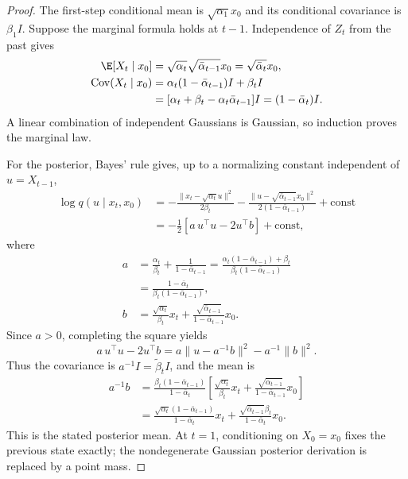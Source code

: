 \begin{proof}
The first-step conditional mean is $\sqrt{\alpha_1}x_0$ and its conditional covariance is $\beta_1I$. Suppose the marginal formula holds at $t-1$. Independence of $Z_t$ from the past gives
\begin{align}
 \E[X_t\mid x_0]
 &=\sqrt{\alpha_t}\sqrt{\bar\alpha_{t-1}}x_0
 =\sqrt{\bar\alpha_t}x_0,\\
 \operatorname{Cov}(X_t\mid x_0)
 &=\alpha_t(1-\bar\alpha_{t-1})I+\beta_tI\\
 &=[\alpha_t+\beta_t-\alpha_t\bar\alpha_{t-1}]I
 =(1-\bar\alpha_t)I.
\end{align}
A linear combination of independent Gaussians is Gaussian, so induction proves the marginal law.

For the posterior, Bayes' rule gives, up to a normalizing constant independent of $u=X_{t-1}$,
\begin{align}
 \log q(u\mid x_t,x_0)
 &= -\frac{\|x_t-\sqrt{\alpha_t}u\|^2}{2\beta_t}
    -\frac{\|u-\sqrt{\bar\alpha_{t-1}}x_0\|^2}{2(1-\bar\alpha_{t-1})}
    +\mathrm{const}\\
 &= -\tfrac12\left[a\,u^\top u-2u^\top b\right]+\mathrm{const},
\end{align}
where
\begin{align}
 a&=\frac{\alpha_t}{\beta_t}+\frac{1}{1-\bar\alpha_{t-1}}
 =\frac{\alpha_t(1-\bar\alpha_{t-1})+\beta_t}{\beta_t(1-\bar\alpha_{t-1})}\\
 &=\frac{1-\bar\alpha_t}{\beta_t(1-\bar\alpha_{t-1})},\\
 b&=\frac{\sqrt{\alpha_t}}{\beta_t}x_t+
      \frac{\sqrt{\bar\alpha_{t-1}}}{1-\bar\alpha_{t-1}}x_0.
\end{align}
Since $a>0$, completing the square yields
\begin{equation}
 a\,u^\top u-2u^\top b
 =a\|u-a^{-1}b\|^2-a^{-1}\|b\|^2.
\end{equation}
Thus the covariance is $a^{-1}I=\widetilde\beta_tI$, and the mean is
\begin{align}
 a^{-1}b
 &=\frac{\beta_t(1-\bar\alpha_{t-1})}{1-\bar\alpha_t}
 \left[\frac{\sqrt{\alpha_t}}{\beta_t}x_t+
       \frac{\sqrt{\bar\alpha_{t-1}}}{1-\bar\alpha_{t-1}}x_0\right]\\
 &=\frac{\sqrt{\alpha_t}(1-\bar\alpha_{t-1})}{1-\bar\alpha_t}x_t+
   \frac{\sqrt{\bar\alpha_{t-1}}\beta_t}{1-\bar\alpha_t}x_0.
\end{align}
This is the stated posterior mean. At $t=1$, conditioning on $X_0=x_0$ fixes the previous state exactly; the nondegenerate Gaussian posterior derivation is replaced by a point mass.
\end{proof}
